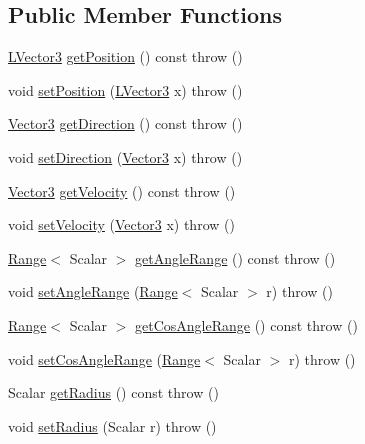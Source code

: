 \subsection*{Public Member Functions}
\begin{DoxyCompactItemize}
\item 
\hyperlink{classAudio_1_1TVector3}{L\+Vector3} \hyperlink{classAudio_1_1Source_ada024d8c7c5e4c5927efda2963fe81c4}{get\+Position} () const   throw ()
\item 
void \hyperlink{classAudio_1_1Source_a28235d6ef6e97308dcc9d89cf57764e5}{set\+Position} (\hyperlink{classAudio_1_1TVector3}{L\+Vector3} x)  throw ()
\item 
\hyperlink{classAudio_1_1TVector3}{Vector3} \hyperlink{classAudio_1_1Source_ab302e1c0c516ec4b153018dbed37f0ac}{get\+Direction} () const   throw ()
\item 
void \hyperlink{classAudio_1_1Source_a1c0210656f9b416696448b1b5363240b}{set\+Direction} (\hyperlink{classAudio_1_1TVector3}{Vector3} x)  throw ()
\item 
\hyperlink{classAudio_1_1TVector3}{Vector3} \hyperlink{classAudio_1_1Source_afa2dc0a120dcdd989562ebb2b0782a4c}{get\+Velocity} () const   throw ()
\item 
void \hyperlink{classAudio_1_1Source_a8f2056253c08414944ae0debfb409d19}{set\+Velocity} (\hyperlink{classAudio_1_1TVector3}{Vector3} x)  throw ()
\item 
\hyperlink{structAudio_1_1Range}{Range}$<$ Scalar $>$ \hyperlink{classAudio_1_1Source_a6143b8a9b5e9e14dd0ef7e3c9280cd8f}{get\+Angle\+Range} () const   throw ()
\item 
void \hyperlink{classAudio_1_1Source_a640e04e4d0d3e84f595592856c24d13e}{set\+Angle\+Range} (\hyperlink{structAudio_1_1Range}{Range}$<$ Scalar $>$ r)  throw ()
\item 
\hyperlink{structAudio_1_1Range}{Range}$<$ Scalar $>$ \hyperlink{classAudio_1_1Source_a3800ac08153c803fb6c631272341b6aa}{get\+Cos\+Angle\+Range} () const   throw ()
\item 
void \hyperlink{classAudio_1_1Source_a94ee7967af61a3b25ca6a78afc0d23f7}{set\+Cos\+Angle\+Range} (\hyperlink{structAudio_1_1Range}{Range}$<$ Scalar $>$ r)  throw ()
\item 
Scalar \hyperlink{classAudio_1_1Source_a028c3f64f311a04ca08c7c09c38fe168}{get\+Radius} () const   throw ()
\item 
void \hyperlink{classAudio_1_1Source_a1aed580fb8be11d68b208177a75e88d4}{set\+Radius} (Scalar r)  throw ()
\item 

\end{DoxyCompactItemize}
